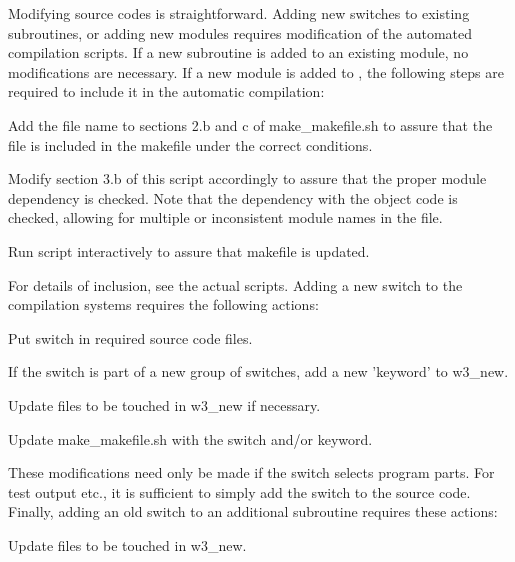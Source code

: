 Modifying source codes is straightforward. Adding new switches to existing
subroutines, or adding new modules requires modification of the automated
compilation scripts. If a new subroutine is added to an existing module, no
modifications are necessary. If a new module is added to \ws, the following
steps are required to include it in the automatic compilation:

\begin{list}{)\hfill}
            { \leftmargin 15mm 
             \rightmargin 5mm \itemsep 0mm \parsep 0mm}
\item Add the file name to sections 2.b and c of {\file make\_makefile.sh} to
      assure that the file is included in the makefile under the correct
      conditions.
\item Modify section 3.b of this script accordingly to assure that the proper
      module dependency is checked. Note that the dependency with the object
      code is checked, allowing for multiple or inconsistent module names in
      the file.
\item Run script interactively to assure that makefile is updated.
\end{list}

\noindent
For details of inclusion, see the actual scripts. Adding a new switch to the
compilation systems requires the following actions:

\begin{list}{)\hfill}
            { \leftmargin 15mm 
             \rightmargin 5mm \itemsep 0mm \parsep 0mm}
\item Put switch in required source code files.
\item If the switch is part of a new group of switches, add a new
      'keyword' to {\file w3\_new}.
\item Update files to be touched in {\file w3\_new} if necessary.
\item Update {\file make\_makefile.sh} with the switch and/or keyword.
\end{list}

\noindent
These modifications need only be made if the switch selects program parts. For
test output etc., it is sufficient to simply add the switch to the source
code. Finally, adding an old switch to an additional subroutine requires these
actions:

\begin{list}{)\hfill}
            { \leftmargin 15mm 
             \rightmargin 5mm \itemsep 0mm \parsep 0mm}
\item Update files to be touched in {\file w3\_new}.
\end{list}

